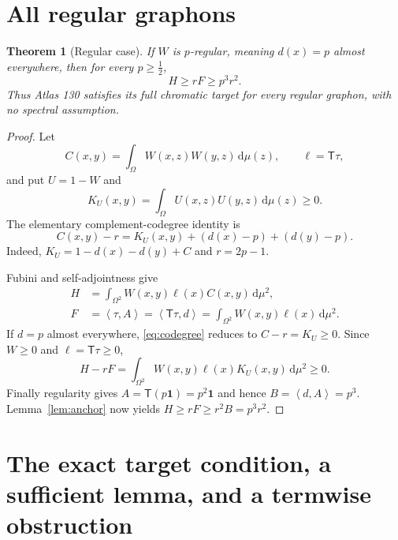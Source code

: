 \documentclass[11pt]{article}
\newtheorem{theorem}{Theorem}[section]
\newcommand{\dd}{\,\mathrm d}
\newcommand{\one}{\mathbf 1}
\newcommand{\ip}[2]{\left\langle #1,#2\right\rangle}
\newcommand{\TT}{\mathsf T}
\begin{document}
\section{All regular graphons}

\begin{theorem}[Regular case]
\label{thm:regular}
If $W$ is $p$-regular, meaning $d(x)=p$ almost everywhere, then for every
$p\geq\tfrac12$,
\[
 H\geq rF\geq p^3r^2.
\]
Thus Atlas 130 satisfies its full chromatic target for every regular
graphon, with no spectral assumption.
\end{theorem}

\begin{proof}
Let
\[
 C(x,y)=\int_\Omega W(x,z)W(y,z)\dd\mu(z),
 \qquad \ell=\TT\tau,
\]
and put $U=1-W$ and
\[
 K_U(x,y)=\int_\Omega U(x,z)U(y,z)\dd\mu(z)\geq0.
\]
The elementary complement-codegree identity is
\begin{equation}
 C(x,y)-r
 =K_U(x,y)+(d(x)-p)+(d(y)-p).
 \label{eq:codegree}
\end{equation}
Indeed, $K_U=1-d(x)-d(y)+C$ and $r=2p-1$.

Fubini and self-adjointness give
\begin{align*}
 H&=\int_{\Omega^2}W(x,y)\ell(x)C(x,y)\dd\mu^2,\\
 F&=\ip\tau A=\ip{\TT\tau}d
   =\int_{\Omega^2}W(x,y)\ell(x)\dd\mu^2.
\end{align*}
If $d=p$ almost everywhere, \eqref{eq:codegree} reduces to
$C-r=K_U\geq0$.  Since $W\geq0$ and $\ell=\TT\tau\geq0$,
\begin{equation}
 H-rF=\int_{\Omega^2}W(x,y)\ell(x)K_U(x,y)\dd\mu^2\geq0.
 \label{eq:regular-repair}
\end{equation}
Finally regularity gives $A=\TT(p\one)=p^2\one$ and hence
$B=\ip dA=p^3$.  Lemma~\ref{lem:anchor} now yields
$H\geq rF\geq r^2B=p^3r^2$.
\end{proof}


\section{The exact target condition, a sufficient lemma, and a termwise obstruction}
\end{document}
